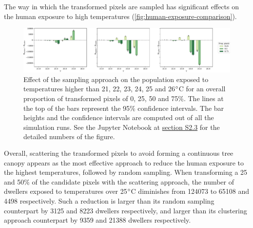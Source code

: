 \documentclass[10pt,letterpaper]{article}
\begin{document}
The way in which the transformed pixels are sampled has significant effects on the human exposure to high temperatures (\autoref{fig:human-exposure-comparison}). 
\begin{figure}[ht]
  \begin{adjustwidth}{-.4\textwidth}{0cm}  
    \centering
    \includegraphics[width=\linewidth]{figures/human-exposure-comparison}
    \caption{\label{fig:human-exposure-comparison} Effect of the sampling approach on the population exposed to temperatures higher than 21, 22, 23, 24, 25 and 26$\degree$C for an overall proportion of transformed pixels of 0, 25, 50 and 75\%. The lines at the top of the bars represent the 95\% confidence intervals. The bar heights and the confidence intervals are computed out of all the simulation runs. See the Jupyter Notebook at \hyperref[sec:si-human-exposure]{section S2.3} for the detailed numbers of the figure.}
  \end{adjustwidth}
\end{figure}
Overall, scattering the transformed pixels to avoid forming a continuous tree canopy appears as the most effective approach to reduce the human exposure to the highest temperatures, followed by random sampling.
When transforming a 25 and 50\% of the candidate pixels with the scattering approach, the number of dwellers exposed to temperatures over 25$\degree$C diminishes from 124073 to 65108 and 4498 respectively. %
Such a reduction is larger than its random sampling counterpart by 3125 and 8223 dwellers respectively, and larger than its clustering approach counterpart by 9359 and 21388 dwellers respectively.
\end{document}
